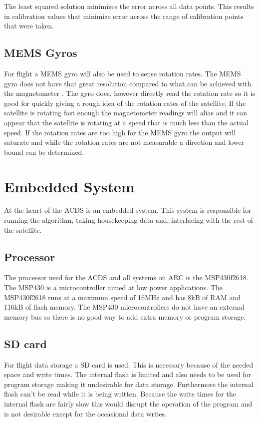 The least squared solution minimizes the error across all data points. This results in calibration values that minimize error across the range of calibration points that were taken.

\subsection{\acs{MEMS} Gyros}

For flight a \ac{MEMS} gyro will also be used to sense rotation rates. The \ac{MEMS} gyro does not have that great resolution compared to what can be achieved with the magnetometer . The gyro does, however directly read the rotation rate so it is good for quickly giving a rough idea of the rotation rates of the satellite. If the satellite is rotating fast enough the magnetometer readings will alias and it can appear that the satellite is rotating at a speed that is much less than the actual speed. If the rotation rates are too high for the \ac{MEMS} gyro the output will saturate and while the rotation rates are not measurable a direction and lower bound can be determined.


\section{Embedded System}

At the heart of the \ac{ACDS} is an embedded system. This system is responsible for running the algorithm, taking housekeeping data and, interfacing with the rest of the satellite.

\subsection{Processor}

The processor used for the \ac{ACDS} and all systems on \ac{ARC} is the MSP430f2618. The MSP430 is a microcontroller aimed at low power applications. The MSP430f2618 runs at a maximum speed of 16MHz and has 8kB of RAM and 116kB of flash memory. The MSP430 microcontrollers do not have an external memory bus so there is no good way to add extra memory or program storage. 

\subsection{SD card}

For flight data storage a SD card is used. This is necessary because of the needed space and write times. The internal flash is limited and also needs to be used for program storage making it undesirable for data storage. Furthermore the internal flash can't be read while it is being written. Because the write times for the internal flash are fairly slow this would disrupt the operation of the program and is not desirable except for the occasional data writes.

